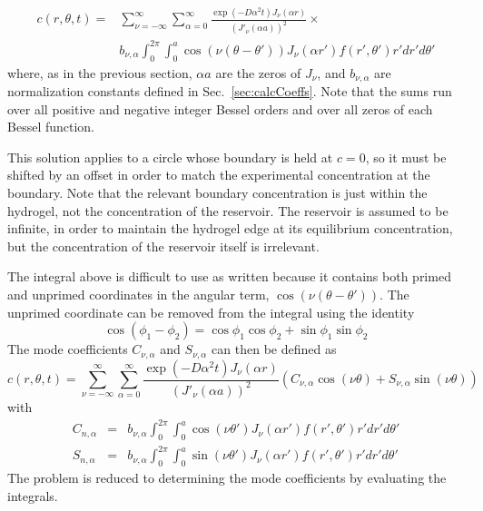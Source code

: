\begin{equation}
\begin{split}
c(r,\theta,t) =& \sum_{\nu=-\infty}^{\infty} \sum_{\alpha = 0}^\infty   \frac{\exp\left(-D\alpha^2t\right)J_\nu\left(\alpha r\right)}{\left(J'_\nu(\alpha a)\right)^2} \times \\ 
&b_{\nu,\alpha} \int_0^{2\pi} \int_0^a \cos\left(\nu(\theta-\theta')\right) J_\nu(\alpha r') f(r',\theta') r' dr' d\theta'
\end{split}
\end{equation}
where, as in the previous section, $\alpha a$ are the zeros of $J_\nu$, and $b_{\nu,\alpha}$ are normalization constants defined in Sec.~\ref{sec:calcCoeffs}.  Note that the sums run over all positive and negative integer Bessel orders and over all zeros of each Bessel function.  

This solution applies to a circle whose boundary is held at $c=0$, so it must be shifted by an offset in order to match the experimental concentration at the boundary.  Note that the relevant boundary concentration is just within the hydrogel, not the concentration of the reservoir.  The reservoir is assumed to be infinite, in order to maintain the hydrogel edge at its equilibrium concentration, but the concentration of the reservoir itself is irrelevant.

The integral above is difficult to use as written because it contains both primed and unprimed coordinates in the angular term, $\cos\left(\nu(\theta -\theta')\right)$.  The unprimed coordinate can be removed from the integral using the identity $$\cos(\phi_1-\phi_2) = \cos\phi_1\cos\phi_2 + \sin\phi_1\sin\phi_2$$ The mode coefficients $C_{\nu,\alpha}$ and $S_{\nu,\alpha}$ can then be defined as
\begin{equation}
c(r,\theta,t) = \sum_{\nu=-\infty}^{\infty} \sum_{\alpha = 0}^\infty   \frac{\exp\left(-D\alpha^2t\right)J_\nu\left(\alpha r\right)}{\left(J'_\nu (\alpha a)\right)^2} \left(C_{\nu,\alpha}\cos(\nu\theta) + S_{\nu,\alpha} \sin(\nu\theta)\right)
\label{eq:full-series}
\end{equation}
with 
\begin{eqnarray}
C_{n,\alpha} & = &b_{\nu,\alpha} \int_0^{2\pi} \int_0^a \cos\left(\nu\theta'\right) J_\nu(\alpha r')f(r',\theta') r' dr' d\theta'\\
\label{eq:c}
S_{n,\alpha} & = & b_{\nu,\alpha}\int_0^{2\pi} \int_0^a \sin\left(\nu\theta'\right) J_\nu(\alpha r') f(r',\theta') r' dr' d\theta'
\label{eq:s}
\end{eqnarray}
The problem is reduced to determining the mode coefficients by evaluating the integrals.

